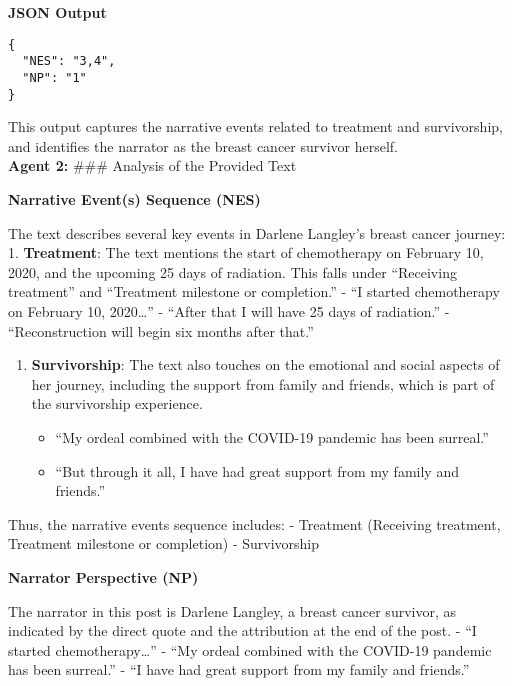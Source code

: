 \textbf{JSON Output}

\begin{verbatim}
{
  "NES": "3,4",
  "NP": "1"
}
\end{verbatim}

This output captures the narrative events related to treatment and
survivorship, and identifies the narrator as the breast cancer survivor
herself.\\

\textbf{Agent 2:} \#\#\# Analysis of the Provided Text

\textbf{Narrative Event(s) Sequence (NES)}

The text describes several key events in Darlene Langley's breast cancer
journey: 1. \textbf{Treatment}: The text mentions the start of
chemotherapy on February 10, 2020, and the upcoming 25 days of
radiation. This falls under ``Receiving treatment'' and ``Treatment
milestone or completion.'' - ``I started chemotherapy on February 10,
2020\ldots{}'' - ``After that I will have 25 days of radiation.'' -
``Reconstruction will begin six months after that.''

\begin{enumerate}
\def\labelenumi{\arabic{enumi}.}
\setcounter{enumi}{1}
\tightlist
\item
  \textbf{Survivorship}: The text also touches on the emotional and
  social aspects of her journey, including the support from family and
  friends, which is part of the survivorship experience.

  \begin{itemize}
  \tightlist
  \item
    ``My ordeal combined with the COVID-19 pandemic has been surreal.''
  \item
    ``But through it all, I have had great support from my family and
    friends.''
  \end{itemize}
\end{enumerate}

Thus, the narrative events sequence includes: - Treatment (Receiving
treatment, Treatment milestone or completion) - Survivorship

\textbf{Narrator Perspective (NP)}

The narrator in this post is Darlene Langley, a breast cancer survivor,
as indicated by the direct quote and the attribution at the end of the
post. - ``I started chemotherapy\ldots{}'' - ``My ordeal combined with
the COVID-19 pandemic has been surreal.'' - ``I have had great support
from my family and friends.''

